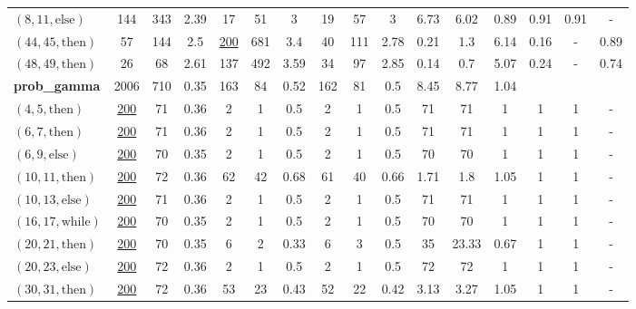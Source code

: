 \documentclass[sigconf,review]{acmart}
\newcommand{\thenBr}{\text{then}}
\newcommand{\elseBr}{\text{else}}
\newcommand{\inWhile}{\text{while}}
\newcommand{\un}[1]{\underline{#1}}
\begin{document}
\begin{table}[!t]
\begin{tabular}{l|ccc|ccc|ccc|ccc|ccc}
    $(8,11,\elseBr)$         & 144      & 343  & 2.39      & 17   & 51   & 3            & 19  & 57  & 3                & 6.73   & 6.02  & 0.89   & 0.91 & 0.91 &  - \\
    $(44,45,\thenBr)$        & 57       & 144  & 2.5       & \un{200} & 681  & 3.4      & 40  & 111 & 2.78             & 0.21   & 1.3   & 6.14   & 0.16 & - &  0.89 \\
    $(48,49,\thenBr)$        & 26       & 68   & 2.61      & 137  & 492  & 3.59         & 34  & 97  & 2.85             & 0.14   & 0.7   & 5.07   & 0.24 & - &  0.74 \\
    \hline
    \textbf{prob\_gamma}     & 2006     & 710  & 0.35      & 163 & 84   & 0.52          & 162 & 81  & 0.5              & 8.45   & 8.77  & 1.04   &  &   &        \\
    $(4,5,\thenBr)$          & \un{200} & 71   & 0.36      & 2   & 1    & 0.5           & 2   & 1   & 0.5              & 71     & 71    & 1      & 1 & 1 &  -  \\
    $(6,7,\thenBr)$          & \un{200} & 71   & 0.36      & 2   & 1    & 0.5           & 2   & 1   & 0.5              & 71     & 71    & 1      & 1 & 1 &  -  \\
    $(6,9,\elseBr)$          & \un{200} & 70   & 0.35      & 2   & 1    & 0.5           & 2   & 1   & 0.5              & 70     & 70    & 1      & 1 & 1 &  -  \\
    $(10,11,\thenBr)$        & \un{200} & 72   & 0.36      & 62  & 42   & 0.68          & 61  & 40  & 0.66             & 1.71   & 1.8   & 1.05   & 1 & 1 &  -  \\
    $(10,13,\elseBr)$        & \un{200} & 71   & 0.36      & 2   & 1    & 0.5           & 2   & 1   & 0.5              & 71     & 71    & 1      & 1 & 1 &  -  \\
    $(16,17,\inWhile)$       & \un{200} & 70   & 0.35      & 2   & 1    & 0.5           & 2   & 1   & 0.5              & 70     & 70    & 1      & 1 & 1 &  -  \\
    $(20,21,\thenBr)$        & \un{200} & 70   & 0.35      & 6   & 2    & 0.33          & 6   & 3   & 0.5              & 35     & 23.33 & 0.67   & 1 & 1 &  -  \\
    $(20,23,\elseBr)$        & \un{200} & 72   & 0.36      & 2   & 1    & 0.5           & 2   & 1   & 0.5              & 72     & 72    & 1      & 1 & 1 &  -  \\
    $(30,31,\thenBr)$        & \un{200} & 72   & 0.36      & 53  & 23   & 0.43          & 52  & 22  & 0.42             & 3.13   & 3.27  & 1.05   & 1 & 1 &  -  \\

\end{tabular}
\end{table}
\end{document}
